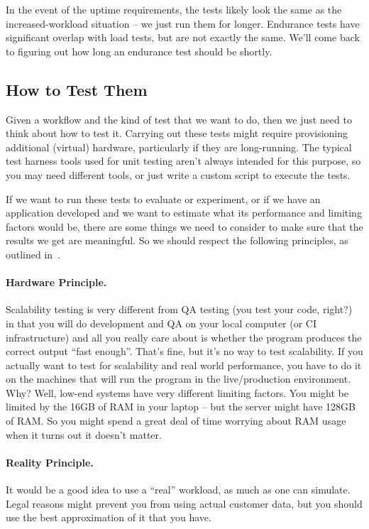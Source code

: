 In the event of the uptime requirements, the tests likely look the same as the increased-workload situation -- we just run them for longer. Endurance tests have significant overlap with load tests, but are not exactly the same. We'll come back to figuring out how long an endurance test should be shortly.


\subsection*{How to Test Them}

Given a workflow and the kind of test that we want to do, then we just need to think about how to test it. Carrying out these tests might require provisioning additional (virtual) hardware, particularly if they are long-running. The typical test harness tools used for unit testing aren't always intended for this purpose, so you may need different tools, or just write a custom script to execute the tests.

If we want to run these tests to evaluate or experiment, or if we have an application developed and we want to estimate what its performance and limiting factors would be, there are some things we need to consider to make sure that the results we get are meaningful. So we should respect the following principles, as outlined in~\cite{swps}.


\paragraph{Hardware Principle.} 
Scalability testing is very different from QA testing (you test your code, right?) in that you will do development and QA on your local computer (or CI infrastructure) and all you really care about is whether the program produces the correct output ``fast enough''. That's fine, but it's no way to test scalability. If you actually want to test for scalability and real world performance, you have to do it on the machines that will run the program in the live/production environment. Why? Well, low-end systems have very different limiting factors. You might be limited by the 16GB of RAM in your laptop -- but the server might have 128GB of RAM. So you might spend a great deal of time worrying about RAM usage when it turns out it doesn't matter.

\paragraph{Reality Principle.}
It would be a good idea to use a ``real'' workload, as much as one can simulate. Legal reasons might prevent you from using actual customer data, but you should use the best approximation of it that you have. 


